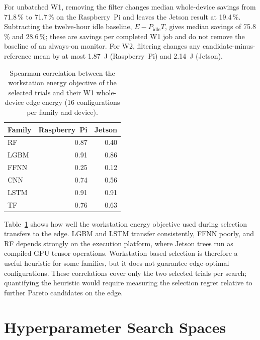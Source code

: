 \documentclass[10pt,a4paper]{article}
\newcommand{\rpi}{Raspberry~Pi}
\newcommand{\jn}{Jetson}
\begin{document}
For unbatched W1, removing the filter changes median whole-device savings from 71.8\,\% to
71.7\,\% on the \rpi{} and leaves the \jn{} result at 19.4\,\%. Subtracting the twelve-hour idle
baseline, $E-P_{\mathrm{idle}}T$, gives median savings of 75.8\,\% and 28.6\,\%; these are
savings per completed W1 job and do not remove the baseline of an always-on monitor. For W2,
filtering changes any candidate-minus-reference mean by at most \SI{1.87}{\joule} (\rpi{}) and
\SI{2.14}{\joule} (\jn{}).

\begin{table}[H]
\centering
\caption{Spearman correlation between the workstation energy objective of the selected trials and
their W1 whole-device edge energy (16 configurations per family and device).}
\label{tab:proxytransfer}
\footnotesize
\setlength{\tabcolsep}{10pt}
\begin{tabular}{@{}lrr@{}}
\toprule
Family & \rpi{} & \jn{} \\
\midrule
RF & 0.87 & 0.40 \\
LGBM & 0.91 & 0.86 \\
FFNN & 0.25 & 0.12 \\
CNN & 0.74 & 0.56 \\
LSTM & 0.91 & 0.91 \\
TF & 0.76 & 0.63 \\
\bottomrule
\end{tabular}
\end{table}

Table~\ref{tab:proxytransfer} shows how well the workstation energy objective used during
selection transfers to the edge. LGBM and LSTM transfer consistently, FFNN poorly, and RF depends
strongly on the execution platform, where \jn{} trees run as compiled GPU tensor operations.
Workstation-based selection is therefore a useful heuristic for some families, but it does not
guarantee edge-optimal configurations. These correlations cover only the two selected trials per
search; quantifying the heuristic would require measuring the selection regret relative to
further Pareto candidates on the edge.

\section{Hyperparameter Search Spaces}\label{app:search}
\end{document}
